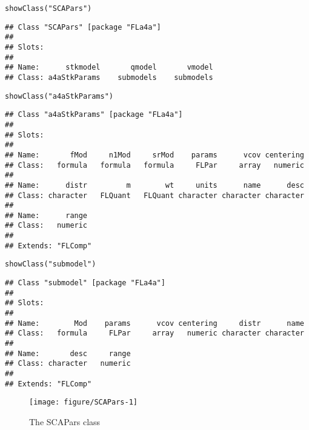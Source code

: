 \documentclass[a4paper,english,10pt]{article}\usepackage[]{graphicx}\usepackage[]{color}
\makeatletter
\def\maxwidth{ %
  \ifdim\Gin@nat@width>\linewidth
    \linewidth
  \else
    \Gin@nat@width
  \fi
}
\newcommand{\hlstr}[1]{\textcolor[rgb]{0.2,0.2,0.2}{#1}}%
\newcommand{\hlstd}[1]{\textcolor[rgb]{0,0,0}{#1}}%
\newcommand{\hlkwd}[1]{\textcolor[rgb]{0.361,0.506,0.596}{#1}}%
\newenvironment{kframe}{%
 \def\at@end@of@kframe{}%
 \ifinner\ifhmode%
  \def\at@end@of@kframe{\end{minipage}}%
  \begin{minipage}{\columnwidth}%
 \fi\fi%
 \def\FrameCommand##1{\hskip\@totalleftmargin \hskip-\fboxsep
 \colorbox{shadecolor}{##1}\hskip-\fboxsep
     \hskip-\linewidth \hskip-\@totalleftmargin \hskip\columnwidth}%
 \MakeFramed {\advance\hsize-\width
   \@totalleftmargin\z@ \linewidth\hsize
   \@setminipage}}%
 {\par\unskip\endMakeFramed%
 \at@end@of@kframe}
\newenvironment{knitrout}{}{} %
\makeatother
\begin{document}
\begin{knitrout}
\color{fgcolor}\begin{kframe}
\begin{alltt}
\hlkwd{showClass}\hlstd{(}\hlstr{"SCAPars"}\hlstd{)}
\end{alltt}
\begin{verbatim}
## Class "SCAPars" [package "FLa4a"]
## 
## Slots:
##                                              
## Name:      stkmodel       qmodel       vmodel
## Class: a4aStkParams    submodels    submodels
\end{verbatim}
\begin{alltt}
\hlkwd{showClass}\hlstd{(}\hlstr{"a4aStkParams"}\hlstd{)}
\end{alltt}
\begin{verbatim}
## Class "a4aStkParams" [package "FLa4a"]
## 
## Slots:
##                                                                   
## Name:       fMod     n1Mod     srMod    params      vcov centering
## Class:   formula   formula   formula     FLPar     array   numeric
##                                                                   
## Name:      distr         m        wt     units      name      desc
## Class: character   FLQuant   FLQuant character character character
##                 
## Name:      range
## Class:   numeric
## 
## Extends: "FLComp"
\end{verbatim}
\begin{alltt}
\hlkwd{showClass}\hlstd{(}\hlstr{"submodel"}\hlstd{)}
\end{alltt}
\begin{verbatim}
## Class "submodel" [package "FLa4a"]
## 
## Slots:
##                                                                   
## Name:        Mod    params      vcov centering     distr      name
## Class:   formula     FLPar     array   numeric character character
##                           
## Name:       desc     range
## Class: character   numeric
## 
## Extends: "FLComp"
\end{verbatim}
\end{kframe}
\end{knitrout}

\begin{knitrout}
\color{fgcolor}\begin{figure}[H]

{\centering \texttt{[image: figure/SCAPars-1]} 

}

\caption[The SCAPars class]{The SCAPars class}\label{fig:SCAPars}
\end{figure}


\end{knitrout}
\end{document}
